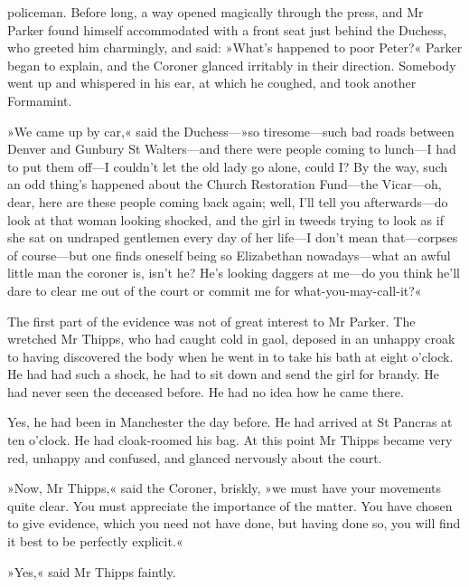 policeman. Before long, a way opened magically through the press, and Mr Parker found himself accommodated with a front seat just behind the Duchess, who greeted him charmingly, and said: »What's happened to poor Peter?« Parker began to explain, and the Coroner glanced irritably in their direction. Somebody went up and whispered in his ear, at which he coughed, and took another Formamint.

»We came up by car,« said the Duchess---»so tiresome\allowbreak---\allowbreak such bad roads between Denver and Gunbury St Walters\allowbreak---\allowbreak and there were people coming to lunch\allowbreak---\allowbreak I had to put them off\allowbreak---\allowbreak I couldn't let the old lady go alone, could I? By the way, such an odd thing's happened about the Church Restoration Fund\allowbreak---\allowbreak the Vicar\allowbreak---\allowbreak oh, dear, here are these people coming back again; well, I'll tell you afterwards\allowbreak---\allowbreak do look at that woman looking shocked, and the girl in tweeds trying to look as if she sat on undraped gentlemen every day of her life\allowbreak---\allowbreak I don't mean that\allowbreak---\allowbreak corpses of course\allowbreak---\allowbreak but one finds oneself being so Elizabethan nowadays\allowbreak---\allowbreak what an awful little man the coroner is, isn't he? He's looking daggers at me\allowbreak---\allowbreak do you think he'll dare to clear me out of the court or commit me for what-you-may-call-it?«

The first part of the evidence was not of great interest to Mr Parker. The wretched Mr Thipps, who had caught cold in gaol, deposed in an unhappy croak to having discovered the body when he went in to take his bath at eight o'clock. He had had such a shock, he had to sit down and send the girl for brandy. He had never seen the deceased before. He had no idea how he came there.

Yes, he had been in Manchester the day before. He had arrived at St Pancras at ten o'clock. He had cloak-roomed his bag. At this point Mr Thipps became very red, unhappy and confused, and glanced nervously about the court.

»Now, Mr Thipps,« said the Coroner, briskly, »we must have your movements quite clear. You must appreciate the importance of the matter. You have chosen to give evidence, which you need not have done, but having done so, you will find it best to be perfectly explicit.«

»Yes,« said Mr Thipps faintly.

